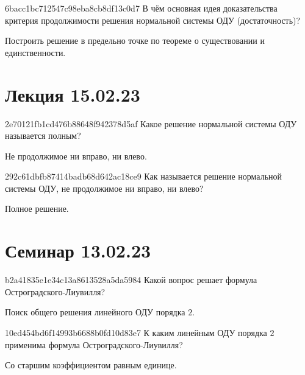 \begin{note}{6bacc1bc712547c98eba8cb8df13c0d7}
    В чём основная идея доказательства критерия продолжимости решения нормальной системы ОДУ (достаточность)?

    \begin{cloze}{1}
        Построить решение в предельно точке по теореме о существовании и единственности.
    \end{cloze}
\end{note}

\section{Лекция 15.02.23}
\begin{note}{2e70121fb1cd476b88648f942378d5af}
    Какое решение нормальной системы ОДУ называется полным?

    \begin{cloze}{1}
        Не продолжимое ни вправо, ни влево.
    \end{cloze}
\end{note}

\begin{note}{292c61dbfb87414badb68d642ac18ce9}
    Как называется решение нормальной системы ОДУ, не продолжимое ни вправо, ни влево?

    \begin{cloze}{1}
        Полное решение.
    \end{cloze}
\end{note}

\section{Семинар 13.02.23}
\begin{note}{b2a41835e1e34c13a8613528a5da5984}
    Какой вопрос решает формула Остроградского-Лиувилля?

    \begin{cloze}{1}
        Поиск общего решения линейного ОДУ порядка \({ 2 }\).
    \end{cloze}
\end{note}

\begin{note}{10ed454bd6f14993b6688b0fd10d83e7}
    К каким линейным ОДУ порядка \({ 2 }\) применима формула Остроградского-Лиувилля?

    \begin{cloze}{1}
        Со старшим коэффициентом равным единице.
    \end{cloze}
\end{note}

